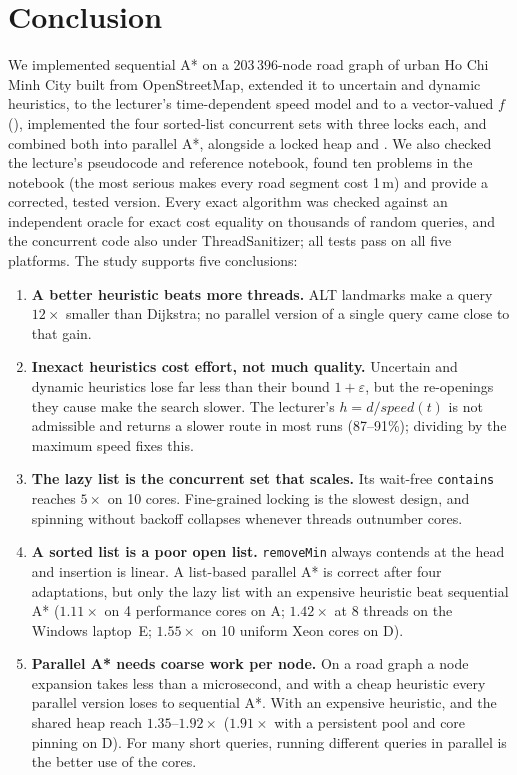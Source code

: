 \section*{Conclusion}

We implemented sequential A* on a 203\,396-node road graph of urban Ho Chi
Minh City built from OpenStreetMap, extended it to uncertain and dynamic
heuristics, to the lecturer's time-dependent speed model and to a
vector-valued $f$ (\NAMOA), implemented the four sorted-list concurrent sets
with three locks each, and combined both into parallel A*, alongside a locked
heap and \HDA. We also checked the lecture's pseudocode and reference notebook,
found ten problems in the notebook (the most serious makes every road segment
cost 1\,m) and provide a corrected, tested version. Every exact algorithm was
checked against an independent oracle for exact cost equality on thousands of
random queries, and the concurrent code also under ThreadSanitizer; all tests
pass on all five platforms. The study supports five conclusions:

\begin{enumerate}[nosep]
  \item \textbf{A better heuristic beats more threads.} ALT landmarks make a
        query $12\times$ smaller than Dijkstra; no parallel version of a
        single query came close to that gain.
  \item \textbf{Inexact heuristics cost effort, not much quality.} Uncertain
        and dynamic heuristics lose far less than their bound $1+\varepsilon$,
        but the re-openings they cause make the search slower. The lecturer's
        $h = d/\mathit{speed}(t)$ is not admissible and returns a slower route
        in most runs (87--91\%); dividing by the maximum speed fixes this.
  \item \textbf{The lazy list is the concurrent set that scales.} Its wait-free
        \texttt{contains} reaches $5\times$ on 10 cores. Fine-grained locking
        is the slowest design, and spinning without backoff collapses
        whenever threads outnumber cores.
  \item \textbf{A sorted list is a poor open list.} \texttt{removeMin} always
        contends at the head and insertion is linear. A list-based parallel A*
        is correct after four adaptations, but only the lazy list with an
        expensive heuristic beat sequential A* ($1.11\times$ on 4 performance cores on A; $1.42\times$ at 8 threads on the Windows laptop~E; $1.55\times$ on 10 uniform Xeon cores on D).
  \item \textbf{Parallel A* needs coarse work per node.} On a road graph a node
        expansion takes less than a microsecond, and with a cheap heuristic
        every parallel version loses to sequential A*. With an expensive
        heuristic, \HDA{} and the shared heap reach $1.35$--$1.92\times$ ($1.91\times$ with a persistent pool and core pinning on D). For
        many short queries, running different queries in parallel is the
        better use of the cores.
\end{enumerate}
